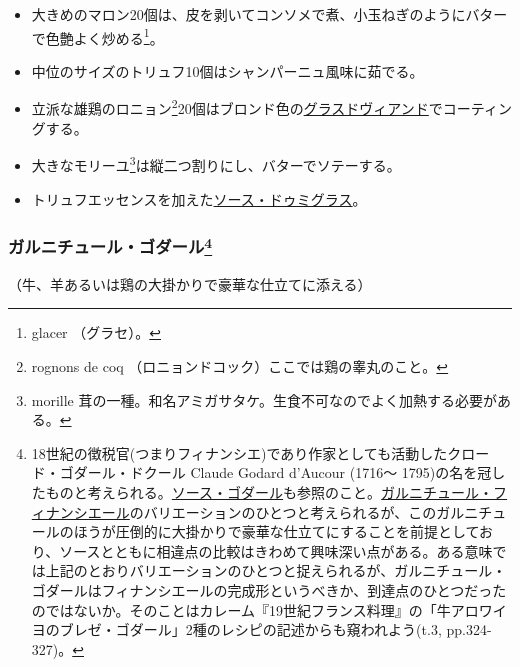 \begin{recette}
\begin{itemize}
\item
  大きめのマロン20個は、皮を剥いてコンソメで煮、小玉ねぎのようにバターで色艶よく炒める\footnote{glacer
    （グラセ）。}。
\item
  中位のサイズのトリュフ10個はシャンパーニュ風味に茹でる。
\item
  立派な雄鶏のロニョン\footnote{rognons de coq
    （ロニョンドコック）ここでは鶏の睾丸のこと。}20個はブロンド色の\protect\hyperlink{glace-de-viande}{グラスドヴィアンド}でコーティングする。
\item
  大きなモリーユ\footnote{morille
    茸の一種。和名アミガサタケ。生食不可なのでよく加熱する必要がある。}は縦二つ割りにし、バターでソテーする。
\item
  トリュフエッセンスを加えた\protect\hyperlink{sauce-demi-glace}{ソース・ドゥミグラス}。
\end{itemize}

\hypertarget{garniture-a-la-florentine}{%
\subsubsection[ガルニチュール・ゴダール]{\texorpdfstring{ガルニチュール・ゴダール\footnote{18世紀の徴税官(つまりフィナンシエ)であり作家としても活動したクロード・ゴダール・ドクール
  Claude Godard d'Aucour (1716〜
  1795)の名を冠したものと考えられる。\protect\hyperlink{sauce-godard}{ソース・ゴダール}も参照のこと。\protect\hyperlink{garniture-a-la-financiere}{ガルニチュール・フィナンシエール}のバリエーションのひとつと考えられるが、このガルニチュールのほうが圧倒的に大掛かりで豪華な仕立てにすることを前提としており、ソースとともに相違点の比較はきわめて興味深い点がある。ある意味では上記のとおりバリエーションのひとつと捉えられるが、ガルニチュール・ゴダールはフィナンシエールの完成形というべきか、到達点のひとつだったのではないか。そのことはカレーム『19世紀フランス料理』の「牛アロワイヨのブレゼ・ゴダール」2種のレシピの記述からも窺われよう(t.3,
  pp.324-327)。}}{ガルニチュール・ゴダール}}\label{garniture-a-la-florentine}}



（牛、羊あるいは鶏の大掛かりで豪華な仕立てに添える）


\end{recette}

